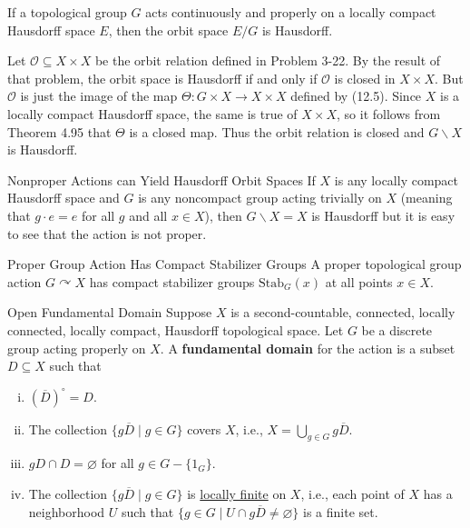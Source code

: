 \documentclass{report}
\def\acts{\curvearrowright}
\begin{document}
\begin{proposition}{}{}
	If a topological group $G$ acts continuously and properly on a locally compact Hausdorff space $E$, then the orbit space $E / G$ is Hausdorff.

\end{proposition}
\begin{prf}
 Let $\mathcal{O} \subseteq X\times X$ be the orbit relation defined in Problem 3-22. By the result of that problem, the orbit space is Hausdorff if and only if $\mathcal{O}$ is closed in $X\times X$. But $\mathcal{O}$ is just the image of the map $\Theta: G \times X \rightarrow X \times X$ defined by (12.5). Since $X$ is a locally compact Hausdorff space, the same is true of $X \times X$, so it follows from Theorem 4.95 that $\Theta$ is a closed map. Thus the orbit relation is closed and $G\backslash X$ is Hausdorff.
\end{prf}

\begin{example}{Nonproper Actions can Yield Hausdorff Orbit Spaces}{} 
	If $X$ is any locally compact Hausdorff space and $G$ is any noncompact group acting trivially on $X$ (meaning that $g \cdot e=e$ for all $g$ and all $x\in X$), then $G\backslash X =X$ is Hausdorff but it is easy to see that the action is not proper.
\end{example}

\begin{proposition}{Proper Group Action Has Compact Stabilizer Groups}{}
	A proper topological group action $G\acts X$ has compact stabilizer groups $\mathrm{Stab}_G(x)$ at all points $x\in X$.
\end{proposition}

\begin{definition}{Open Fundamental Domain}{}
	Suppose $X$ is a second-countable, connected, locally connected, locally compact, Hausdorff topological space. Let $G$ be a discrete group acting properly on $X$. A \textbf{fundamental domain} for the action is a subset $D \subseteq X$ such that
	\begin{enumerate}[(i)]
		\item $\left(\overline{D}\right)^{\circ}=D$.
		\item The collection $\{g \overline{D} \mid g \in G\}$ covers $X$, i.e., $X=\bigcup_{g \in G} g \overline{D}$.
		\item $gD \cap D=\varnothing$ for all $g \in G-\{1_G\}$.
		\item The collection $\{g \overline{D} \mid g \in G\}$ is \hyperref[th:locally_finite_subset_family]{locally finite} on $X$, i.e., each point of $X$ has a neighborhood $U$ such that $\{g \in G \mid U \cap g \overline{D} \neq \varnothing\}$ is a finite set.
	\end{enumerate}
\end{definition}
\end{document}
